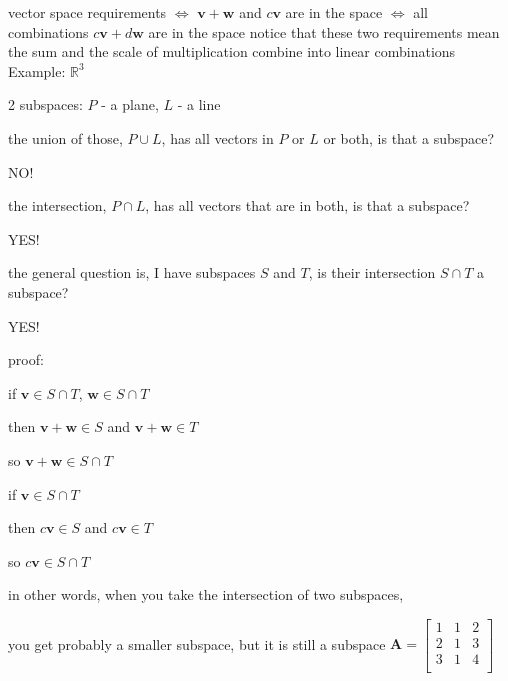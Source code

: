 \documentclass[12pt, a4paper]{article}
\begin{document}
{vector space requirements
\newline
$\Longleftrightarrow$ ${\mathbf{v+w}}$ and $c{\mathbf{v}}$ are in the space
\newline
$\Longleftrightarrow$ all combinations $c{\mathbf{v}}+d{\mathbf{w}}$ are in the space
\vspace{14pt}
\newline
notice that these two requirements mean
\newline
the sum and the scale of multiplication combine into linear combinations
\vspace{14pt}
\newline
Example: $\mathbb{R}^3$
\par 2 subspaces: $P$ - a plane, $L$ - a line
\par {} the union of those, $P \cup L$, has all vectors in $P$ or $L$ or both, is that a subspace?
\par NO!
\par {} the intersection, $P \cap L$, has all vectors that are in both, is that a subspace?
\par YES!
\par the general question is, I have subspaces $S$ and $T$, is their intersection $S \cap T$ a subspace?
\par YES!
\par proof:
\par\qquad if ${\mathbf{v}} \in S \cap T$, ${\mathbf{w}} \in S \cap T$
\par\qquad then ${\mathbf{v}}+{\mathbf{w}} \in S$ and ${\mathbf{v}}+{\mathbf{w}} \in T$
\par\qquad so ${\mathbf{v}}+{\mathbf{w}} \in S \cap T$
\par\qquad if ${\mathbf{v}} \in S \cap T$
\par\qquad then $c{\mathbf{v}} \in S$ and $c{\mathbf{v}} \in T$
\par\qquad so $c{\mathbf{v}} \in S \cap T$
\par in other words, when you take the intersection of two subspaces, 
\par you get probably a smaller subspace, but it is still a subspace
\vspace{31pt}
\newline
\begin{math}
	{\mathbf{A}} = 
	\begin{bmatrix}
		1 & 1 & 2 \\
		2 & 1 & 3 \\
		3 & 1 & 4 \\

\end{bmatrix}
\end{math}}
\end{document}
